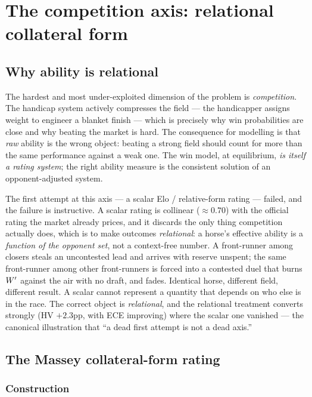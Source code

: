 \chapter{The competition axis: relational collateral form}
\label{ch:competition}

\section{Why ability is relational}

The hardest and most under-exploited dimension of the problem is \emph{competition}. The handicap
system actively compresses the field --- the handicapper assigns weight to engineer a blanket
finish --- which is precisely why win probabilities are close and why beating the market is hard.
The consequence for modelling is that \emph{raw} ability is the wrong object: beating a strong
field should count for more than the same performance against a weak one. The win model, at
equilibrium, \emph{is itself a rating system}; the right ability measure is the consistent
solution of an opponent-adjusted system.

The first attempt at this axis --- a scalar Elo / relative-form rating --- failed, and the failure
is instructive. A scalar rating is collinear ($\approx 0.70$) with the official rating the market
already prices, and it discards the only thing competition actually does, which is to make outcomes
\emph{relational}: a horse's effective ability is a \emph{function of the opponent set}, not a
context-free number. A front-runner among closers steals an uncontested lead and arrives with
reserve unspent; the same front-runner among other front-runners is forced into a contested duel
that burns ${W^{\prime}}$ against the air with no draft, and fades. Identical horse, different field,
different result. A scalar cannot represent a quantity that depends on who else is in the race. The
correct object is \emph{relational}, and the relational treatment converts strongly (HV $+2.3$pp,
with ECE improving) where the scalar one vanished --- the canonical illustration that ``a dead
first attempt is not a dead axis.''

\section{The Massey collateral-form rating}

\subsection{Construction}

